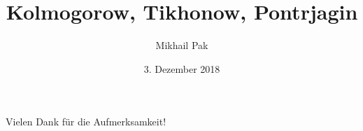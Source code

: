 \documentclass[11pt, ngerman]{beamer}
\title{Kolmogorow, Tikhonow, Pontrjagin}
\date{3. Dezember 2018}
\author{Mikhail Pak}
\institute{CC BY-NC-SA 4.0}
\begin{document}
  \maketitle

  \begin{frame}
    \centering
    Vielen Dank für die Aufmerksamkeit!
  \end{frame}
\end{document}
